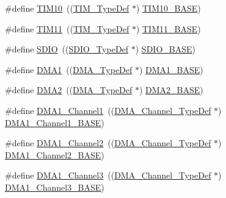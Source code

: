 \begin{DoxyCompactItemize}
\item 
\#define \hyperlink{group___peripheral__declaration_ga46b2ad3f5f506f0f8df0d2ec3e767267}{T\+I\+M10}~((\hyperlink{struct_t_i_m___type_def}{T\+I\+M\+\_\+\+Type\+Def} $\ast$) \hyperlink{group___peripheral__memory__map_ga3eff32f3801db31fb4b61d5618cad54a}{T\+I\+M10\+\_\+\+B\+A\+SE})
\item 
\#define \hyperlink{group___peripheral__declaration_gacfd11ef966c7165f57e2cebe0abc71ad}{T\+I\+M11}~((\hyperlink{struct_t_i_m___type_def}{T\+I\+M\+\_\+\+Type\+Def} $\ast$) \hyperlink{group___peripheral__memory__map_ga3a4a06bb84c703084f0509e105ffaf1d}{T\+I\+M11\+\_\+\+B\+A\+SE})
\item 
\#define \hyperlink{group___peripheral__declaration_ga8149aa2760fffac16bc75216d5fd9331}{S\+D\+IO}~((\hyperlink{struct_s_d_i_o___type_def}{S\+D\+I\+O\+\_\+\+Type\+Def} $\ast$) \hyperlink{openmotestm_2library_2inc_2stm32f10x__map_8h_a95dd0abbc6767893b4b02935fa846f52}{S\+D\+I\+O\+\_\+\+B\+A\+SE})
\item 
\#define \hyperlink{group___peripheral__declaration_gacc16d2a5937f7585320a98f7f6b578f9}{D\+M\+A1}~((\hyperlink{struct_d_m_a___type_def}{D\+M\+A\+\_\+\+Type\+Def} $\ast$) \hyperlink{openmotestm_2library_2inc_2stm32f10x__map_8h_ab2d8a917a0e4ea99a22ac6ebf279bc72}{D\+M\+A1\+\_\+\+B\+A\+SE})
\item 
\#define \hyperlink{group___peripheral__declaration_ga506520140eec1708bc7570c49bdf972d}{D\+M\+A2}~((\hyperlink{struct_d_m_a___type_def}{D\+M\+A\+\_\+\+Type\+Def} $\ast$) \hyperlink{openmotestm_2library_2inc_2stm32f10x__map_8h_ab72a9ae145053ee13d1d491fb5c1df64}{D\+M\+A2\+\_\+\+B\+A\+SE})
\item 
\#define \hyperlink{group___peripheral__declaration_gac83c5be824be1c02716e2522e80ddf7a}{D\+M\+A1\+\_\+\+Channel1}~((\hyperlink{struct_d_m_a___channel___type_def}{D\+M\+A\+\_\+\+Channel\+\_\+\+Type\+Def} $\ast$) \hyperlink{openmotestm_2library_2inc_2stm32f10x__map_8h_a888dbc1608243badeb3554ffedc7364c}{D\+M\+A1\+\_\+\+Channel1\+\_\+\+B\+A\+SE})
\item 
\#define \hyperlink{group___peripheral__declaration_ga23d7631dd10c645e06971b2543ba2949}{D\+M\+A1\+\_\+\+Channel2}~((\hyperlink{struct_d_m_a___channel___type_def}{D\+M\+A\+\_\+\+Channel\+\_\+\+Type\+Def} $\ast$) \hyperlink{openmotestm_2library_2inc_2stm32f10x__map_8h_a38a70090eef3687e83fa6ac0c6d22267}{D\+M\+A1\+\_\+\+Channel2\+\_\+\+B\+A\+SE})
\item 
\#define \hyperlink{group___peripheral__declaration_gacf7b6093a37b306d7f1f50b2f200f0d0}{D\+M\+A1\+\_\+\+Channel3}~((\hyperlink{struct_d_m_a___channel___type_def}{D\+M\+A\+\_\+\+Channel\+\_\+\+Type\+Def} $\ast$) \hyperlink{openmotestm_2library_2inc_2stm32f10x__map_8h_a70b3d9f36ca9ce95b4e421c11154fe5d}{D\+M\+A1\+\_\+\+Channel3\+\_\+\+B\+A\+SE})

\end{DoxyCompactItemize}

